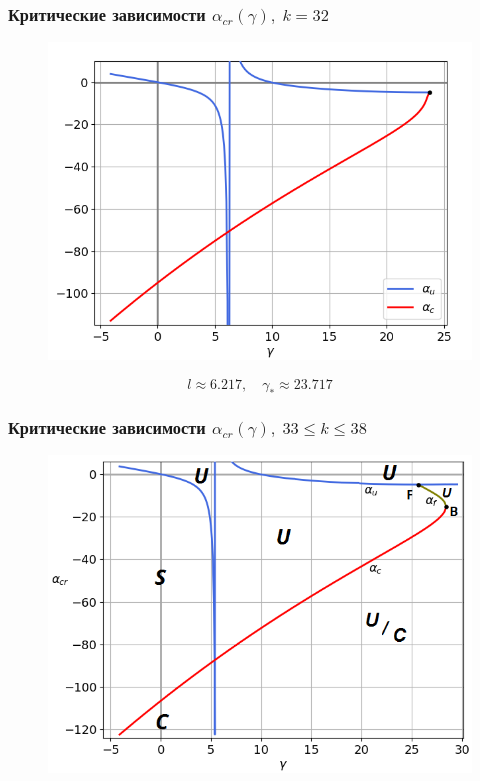 \documentclass[fullscreen=true, unicode, bookmarks=false]{beamer}
\begin{document}
\begin{frame}
\frametitle{ Критические зависимости $ \alpha_{cr}(\gamma), \; k = 32 $ }

\begin{figure} 
\includegraphics[scale=0.55]{alphas_063.png}  
\end{figure}
$$ l \approx 6.217, \quad \gamma_* \approx 23.717 $$

\end{frame}

\begin{frame}
\frametitle{ Критические зависимости $ \alpha_{cr}(\gamma), \; 33 \leqslant k \leqslant 38 $ }

\begin{figure} 
\includegraphics[scale=0.59]{scheme3338.png}  
\end{figure}

\end{frame}
\end{document}
